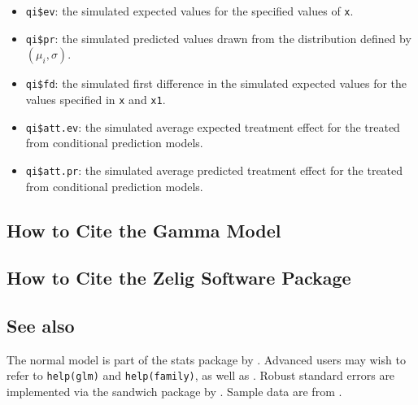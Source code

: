 \documentclass{article}
\begin{document}
\begin{itemize}
   \begin{itemize}
   \item {\tt qi\$ev}: the simulated expected values for the specified
     values of {\tt x}.
   \item {\tt qi\$pr}: the simulated predicted values drawn from the
     distribution defined by $(\mu_i, \sigma)$.
   \item {\tt qi\$fd}: the simulated first difference in the simulated
     expected values for the values specified in {\tt x} and {\tt x1}.
   \item {\tt qi\$att.ev}: the simulated average expected treatment
     effect for the treated from conditional prediction models.  
   \item {\tt qi\$att.pr}: the simulated average predicted treatment
     effect for the treated from conditional prediction models.  
   \end{itemize}
\end{itemize}






\subsection*{How to Cite the Gamma Model}

\subsection*{How to Cite the Zelig Software Package}
\CiteZelig


\subsection* {See also}
The normal model is part of the stats package by \citet{VenRip02}.
Advanced users may wish to refer to \texttt{help(glm)} and
\texttt{help(family)}, as well as \cite{McCNel89}. Robust standard
errors are implemented via the sandwich package by \citet{Zeileis04}.
Sample data are from \cite{KinTomWit00}.



 
\end{document}

